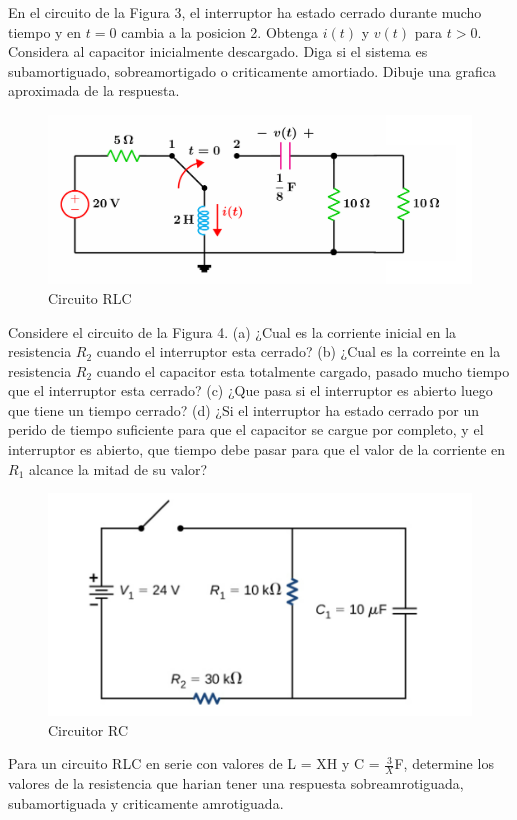 \documentclass[10pt, legalpaper]{exam}
\begin{document}
\begin{questions}
\addpoints
\question[5] En el circuito de la Figura 3, el interruptor ha estado cerrado durante mucho tiempo y en $t = 0$ cambia a la posicion 2. Obtenga $i(t)$ y $v(t)$ para $ t > 0$. Considera al capacitor inicialmente descargado. Diga si el sistema es subamortiguado, sobreamortigado o criticamente amortiado. Dibuje una grafica aproximada de la respuesta.
\begin{figure}[h]
    \centering
    \includegraphics[width=0.7\linewidth]{Screenshot 2024-07-26 222326.png}
    \caption{Circuito RLC}
    \label{fig:enter-label}
\end{figure}
\question[5] Considere el circuito de la Figura 4. (a) ¿Cual es la corriente inicial en la resistencia $R_2$ cuando el interruptor esta cerrado? (b) ¿Cual es la correinte en la resistencia $R_2$ cuando el capacitor esta totalmente cargado, pasado mucho tiempo que el interruptor esta cerrado? (c) ¿Que pasa si el interruptor es abierto luego que tiene un tiempo cerrado? (d) ¿Si el interruptor ha estado cerrado por un perido de tiempo suficiente para que el capacitor se cargue por completo, y el interruptor es abierto, que tiempo debe pasar para que el valor de la corriente en $R_1$ alcance la mitad de su valor?
\begin{figure}[h]
    \centering
    \includegraphics[width=0.8\linewidth]{Screenshot 2024-07-26 232957.png}
    \caption{Circuitor RC}
    \label{fig:enter-label}
\end{figure}
\question[5] Para un circuito RLC en serie con valores de  L = XH y C = $\frac{3}{X}$F, determine los valores de la resistencia que harian tener una respuesta sobreamrotiguada, subamortiguada y criticamente amrotiguada.

\end{questions}
\
\end{document}
